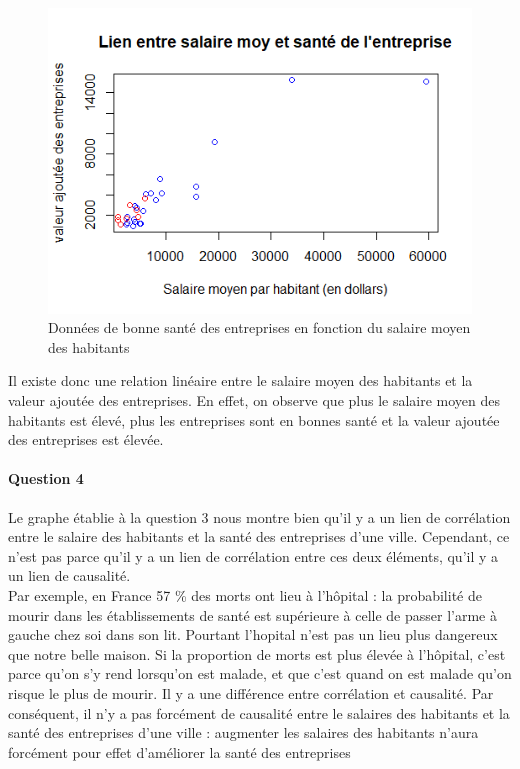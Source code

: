\documentclass[oneside,a4paper,13pt]{book}
\begin{document}
\begin{figure}[H]
\centering
  \includegraphics[width=0.8\linewidth]{Images/sante.png}
  \caption{Données de bonne santé des entreprises en fonction du salaire moyen des habitants}
  \label{fig:q3}
\end{figure}

Il existe donc une relation linéaire entre le salaire moyen des habitants et la valeur ajoutée des entreprises. En effet, on observe que plus le salaire moyen des habitants est élevé, plus les entreprises sont en bonnes santé et la valeur ajoutée des entreprises est élevée. 

\paragraph{Question 4}
Le graphe établie à la question 3 nous montre bien qu'il y a un lien de corrélation entre le salaire des habitants et la santé des entreprises d'une ville. Cependant, ce n'est pas parce qu'il y a un lien de corrélation entre ces deux éléments, qu'il y a un lien de causalité. \\
Par exemple, en France 57 \% des morts ont lieu à l’hôpital : la probabilité de mourir dans les établissements de santé est supérieure à celle de passer l’arme à gauche chez soi dans son lit. Pourtant l'hopital n'est pas un lieu plus dangereux que notre belle maison. Si la proportion de morts est plus élevée à l’hôpital, c’est parce qu’on s’y rend lorsqu’on est malade, et que c’est quand on est malade qu’on risque le plus de mourir. Il y a une différence entre corrélation et causalité. 
\smallbreak
Par conséquent, il n'y a pas forcément de causalité entre le salaires des habitants et la santé des entreprises d'une ville : augmenter les salaires des habitants n'aura forcément pour effet d’améliorer la santé des entreprises 
\end{document}
